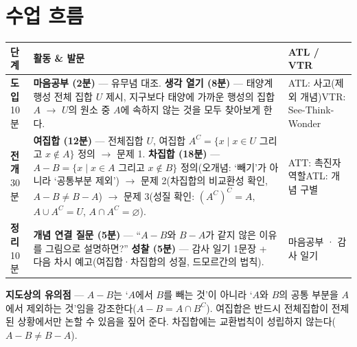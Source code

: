 \documentclass[11pt,a4paper]{article}
\begin{document}
\section{수업 흐름}
\begin{tabularx}{\linewidth}{@{}>{\centering\arraybackslash}p{1.6cm}X>{\raggedright\arraybackslash\small}p{3.1cm}@{}}
\toprule
\textbf{단계} & \textbf{활동 \& 발문} & \textbf{ATL / VTR} \\
\midrule
\textcolor{goldstrong}{\textbf{도입}}\newline\footnotesize 10분 &
\textbf{마음공부 (2분)} --- 유무념 대조.\newline
\textbf{생각 열기 (8분)} --- 태양계 행성 전체 집합 $U$ 제시, 지구보다 태양에 가까운 행성의 집합 $A$ $\to$ $U$의 원소 중 $A$에 속하지 않는 것을 모두 찾아보게 한다. &
ATL: 사고(제외 개념)\newline VTR: See-Think-Wonder \\
\addlinespace
\textcolor{goldstrong}{\textbf{전개}}\newline\footnotesize 30분 &
\textbf{여집합 (12분)} --- 전체집합 $U$, 여집합 $A^C=\{x\mid x\in U$ 그리고 $x\notin A\}$ 정의 $\to$ 문제 1.\newline
\textbf{차집합 (18분)} --- $A-B=\{x\mid x\in A$ 그리고 $x\notin B\}$ 정의(오개념: `빼기'가 아니라 `공통부분 제외') $\to$ 문제 2(차집합의 비교환성 확인, $A-B\neq B-A$) $\to$ 문제 3(성질 확인: $(A^C)^C=A$, $A\cup A^C=U$, $A\cap A^C=\varnothing$). &
ATT: 촉진자 역할\newline ATL: 개념 구별 \\
\addlinespace
\textcolor{goldstrong}{\textbf{정리}}\newline\footnotesize 10분 &
\textbf{개념 연결 질문 (5분)} --- ``$A-B$와 $B-A$가 같지 않은 이유를 그림으로 설명하면?''\newline
\textbf{성찰 (5분)} --- 감사 일기 1문장 + 다음 차시 예고(여집합·차집합의 성질, 드모르간의 법칙). &
마음공부 · 감사 일기 \\
\bottomrule
\end{tabularx}

\begin{calloutbox}
\textbf{지도상의 유의점} --- $A-B$는 `$A$에서 $B$를 빼는 것'이 아니라 `$A$와 $B$의 공통 부분을 $A$에서 제외하는 것'임을 강조한다($A-B=A\cap B^C$). 여집합은 반드시 전체집합이 전제된 상황에서만 논할 수 있음을 짚어 준다. 차집합에는 교환법칙이 성립하지 않는다($A-B\neq B-A$).
\end{calloutbox}
\end{document}
